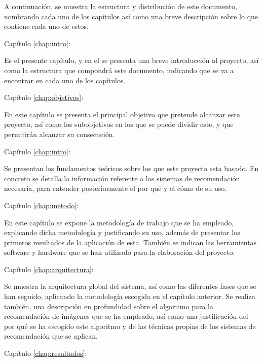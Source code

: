 A continuación, se muestra la estructura y distribución de este documento, nombrando cada uno de los capítulos así como una breve descripción sobre lo que contiene cada uno de estos.
\begin{definitionlist}

\item[Capítulo \ref{chap:intro}:\nameref{chap:intro}]

Es el presente capítulo, y en el se presenta una breve introducción al proyecto, así como la estructura que compondrá este documento, indicando que se va a encontrar en cada uno de los capítulos.


\item[Capítulo \ref{chap:objetivos}:\nameref{chap:objetivos}]

En este capítulo se presenta el principal objetivo que pretende alcanzar este proyecto, así como los subobjetivos en los que se puede dividir este, y que permitirán alcanzar su consecución.

\item[Capítulo \ref{chap:intro}:\nameref{chap:antecedentes}]

Se presentan los fundamentos teóricos sobre los que este proyecto esta basado. En concreto se detalla la información referente a los sistemas de recomendación necesaria, para entender posteriormente el por qué y el cómo de su uso.

\item[Capítulo \ref{chap:metodo}:\nameref{chap:metodo}]

En este capítulo se expone la metodología de trabajo que se ha empleado, explicando dicha metodología y justificando su uso, además de presentar los primeros resultados de la aplicación de esta. También se indican las herramientas software y hardware que se han utilizado para la elaboración del proyecto.

\item[Capítulo \ref{chap:arquitectura}:\nameref{chap:arquitectura}]

Se muestra la arquitectura global del sistema, así como las diferentes fases que se han seguido, aplicando la metodología escogida en el capítulo anterior. Se realiza también, una descripción en profundidad sobre el algoritmo para la recomendación de imágenes que se ha empleado, así como una justificación del por qué se ha escogido este algoritmo y de las técnicas propias de los sistemas de recomendación que se aplican.

\item[Capítulo \ref{chap:resultados}:\nameref{chap:resultados}]


\end{definitionlist}
